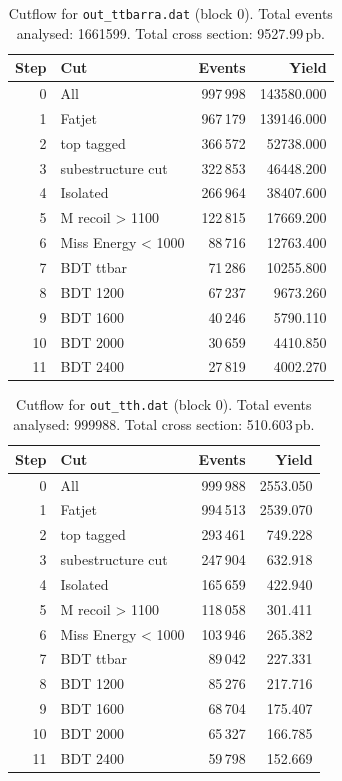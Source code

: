 \documentclass{article}
\begin{document}
\begin{table}[H]
\centering
\begin{tabular}{r l r r}
\toprule
Step & Cut & Events & Yield \\
\midrule
0 & All & 997\,998 & 143580.000 \\
1 & Fatjet & 967\,179 & 139146.000 \\
2 & top tagged & 366\,572 & 52738.000 \\
3 & subestructure cut & 322\,853 & 46448.200 \\
4 & Isolated & 266\,964 & 38407.600 \\
5 & M recoil > 1100 & 122\,815 & 17669.200 \\
6 & Miss Energy < 1000 & 88\,716 & 12763.400 \\
7 & BDT ttbar & 71\,286 & 10255.800 \\
8 & BDT 1200 & 67\,237 & 9673.260 \\
9 & BDT 1600 & 40\,246 & 5790.110 \\
10 & BDT 2000 & 30\,659 & 4410.850 \\
11 & BDT 2400 & 27\,819 & 4002.270 \\
\bottomrule
\end{tabular}
\caption{Cutflow for \texttt{out\_ttbarra.dat} (block 0). Total events analysed: 1661599. Total cross section: 9527.99\,pb.}
\label{tab:cutflow-out-ttbarra-dat}
\end{table}

\begin{table}[H]
\centering
\begin{tabular}{r l r r}
\toprule
Step & Cut & Events & Yield \\
\midrule
0 & All & 999\,988 & 2553.050 \\
1 & Fatjet & 994\,513 & 2539.070 \\
2 & top tagged & 293\,461 & 749.228 \\
3 & subestructure cut & 247\,904 & 632.918 \\
4 & Isolated & 165\,659 & 422.940 \\
5 & M recoil > 1100 & 118\,058 & 301.411 \\
6 & Miss Energy < 1000 & 103\,946 & 265.382 \\
7 & BDT ttbar & 89\,042 & 227.331 \\
8 & BDT 1200 & 85\,276 & 217.716 \\
9 & BDT 1600 & 68\,704 & 175.407 \\
10 & BDT 2000 & 65\,327 & 166.785 \\
11 & BDT 2400 & 59\,798 & 152.669 \\
\bottomrule
\end{tabular}
\caption{Cutflow for \texttt{out\_tth.dat} (block 0). Total events analysed: 999988. Total cross section: 510.603\,pb.}
\label{tab:cutflow-out-tth-dat}
\end{table}
\end{document}
